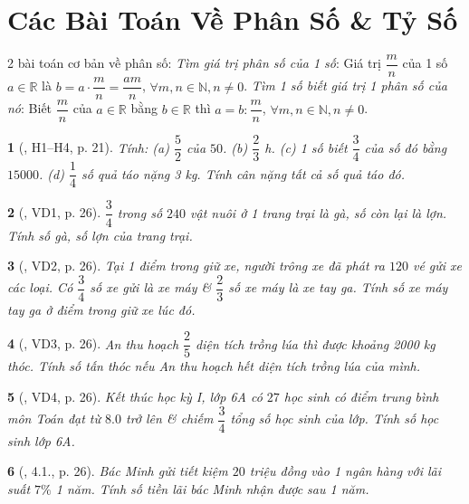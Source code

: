 \documentclass{article}
\newtheorem{baitoan}{}
\begin{document}

\section{Các Bài Toán Về Phân Số \& Tỷ Số}
2 bài toán cơ bản về phân số:  \textit{Tìm giá trị phân số của 1 số}: Giá trị $\dfrac{m}{n}$ của 1 số $a\in\mathbb{R}$ là $b = a\cdot\dfrac{m}{n} = \dfrac{am}{n}$, $\forall m,n\in\mathbb{N},n\ne0$.  \textit{Tìm 1 số biết giá trị 1 phân số của nó}: Biết $\dfrac{m}{n}$ của $a\in\mathbb{R}$ bằng $b\in\mathbb{R}$ thì $a = b:\dfrac{m}{n}$, $\forall m,n\in\mathbb{N},n\ne0$.

\begin{baitoan}[\cite{Binh_boi_duong_Toan_6_tap_2}, H1--H4, p. 21]
	Tính: (a) $\dfrac{5}{2}$ của $50$. (b) $\dfrac{2}{3}$ {\rm h}. (c) 1 số biết $\dfrac{3}{4}$ của số đó bằng $15000$. (d) $\dfrac{1}{4}$ số quả táo nặng {\rm3 kg}. Tính cân nặng tất cả số quả táo đó.
\end{baitoan}

\begin{baitoan}[\cite{Binh_boi_duong_Toan_6_tap_2}, VD1, p. 26]
	$\dfrac{3}{4}$ trong số $240$ vật nuôi ở 1 trang trại là gà, số còn lại là lợn. Tính số gà, số lợn của trang trại.
\end{baitoan}

\begin{baitoan}[\cite{Binh_boi_duong_Toan_6_tap_2}, VD2, p. 26]
	Tại 1 điểm trong giữ xe, người trông xe đã phát ra $120$ vé gửi xe các loại. Có $\dfrac{3}{4}$ số xe gửi là xe máy \& $\dfrac{2}{3}$ số xe máy là xe tay ga. Tính số xe máy tay ga ở điểm trong giữ xe lúc đó.
\end{baitoan}

\begin{baitoan}[\cite{Binh_boi_duong_Toan_6_tap_2}, VD3, p. 26]
	An thu hoạch $\dfrac{2}{5}$ diện tích trồng lúa thì được khoảng {\rm2000 kg} thóc. Tính số tấn thóc nếu An thu hoạch hết diện tích trồng lúa của mình.
\end{baitoan}

\begin{baitoan}[\cite{Binh_boi_duong_Toan_6_tap_2}, VD4, p. 26]
	Kết thúc học kỳ I, lớp 6A có $27$ học sinh có điểm trung bình môn Toán đạt từ $8.0$ trở lên \& chiếm $\dfrac{3}{4}$ tổng số học sinh của lớp. Tính số học sinh lớp 6A.
\end{baitoan}

\begin{baitoan}[\cite{Binh_boi_duong_Toan_6_tap_2}, 4.1., p. 26]
	Bác Minh gửi tiết kiệm $20$ triệu đồng vào 1 ngân hàng với lãi suất $7\%$ 1 năm. Tính số tiền lãi bác Minh nhận được sau 1 năm.
\end{baitoan}
\end{document}
